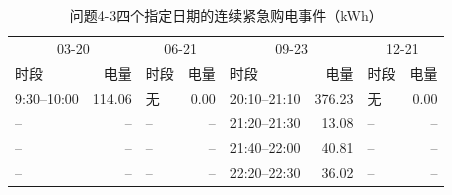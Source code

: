 \begin{table}[H]\centering\scriptsize
\caption{问题4-3四个指定日期的连续紧急购电事件（kWh）}\label{tab:q4_3_emergency}
\begin{tabular}{lrlrlrlr}\toprule
\multicolumn{2}{c}{03-20} & \multicolumn{2}{c}{06-21} & \multicolumn{2}{c}{09-23} & \multicolumn{2}{c}{12-21} \\
时段 & 电量 & 时段 & 电量 & 时段 & 电量 & 时段 & 电量 \\\midrule
9:30--10:00 & 114.06 & 无 & 0.00 & 20:10--21:10 & 376.23 & 无 & 0.00 \\
-- & -- & -- & -- & 21:20--21:30 & 13.08 & -- & -- \\
-- & -- & -- & -- & 21:40--22:00 & 40.81 & -- & -- \\
-- & -- & -- & -- & 22:20--22:30 & 36.02 & -- & -- \\
\bottomrule\end{tabular}\end{table}
